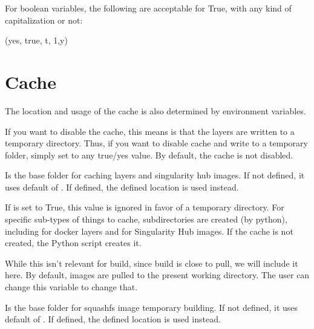 \documentclass[letterpaper,10pt,english]{sphinxmanual}
\begin{document}
For boolean variables, the following are acceptable for True, with any
kind of capitalization or not:

%
\begin{sphinxVerbatim}[commandchars=\\\{\}]
(\PYGZdq{}yes\PYGZdq{}, \PYGZdq{}true\PYGZdq{}, \PYGZdq{}t\PYGZdq{}, \PYGZdq{}1\PYGZdq{},\PYGZdq{}y\PYGZdq{})
\end{sphinxVerbatim}


\section{Cache}
\label{\detokenize{build_environment:cache}}
The location and usage of the cache is also determined by environment
variables.

 If you want to disable the cache, this
means is that the layers are written to a temporary directory. Thus,
if you want to disable cache and write to a temporary folder, simply
set  to any true/yes value. By default, the cache is not disabled.

 Is the base folder for caching layers and
singularity hub images. If not defined, it uses default of . If
defined, the defined location is used instead.

If  is set to True, this value is ignored in favor of a temporary
directory. For specific sub-types of things to cache, subdirectories
are created (by python), including  for docker layers and  for
Singularity Hub images. If the cache is not created, the Python script
creates it.

 While this isn’t relevant for build, since
build is close to pull, we will include it here. By default, images
are pulled to the present working directory. The user can change this
variable to change that.

 Is the base folder for squashfs image
temporary building. If not defined, it uses default of . If defined,
the defined location is used instead.
\end{document}
